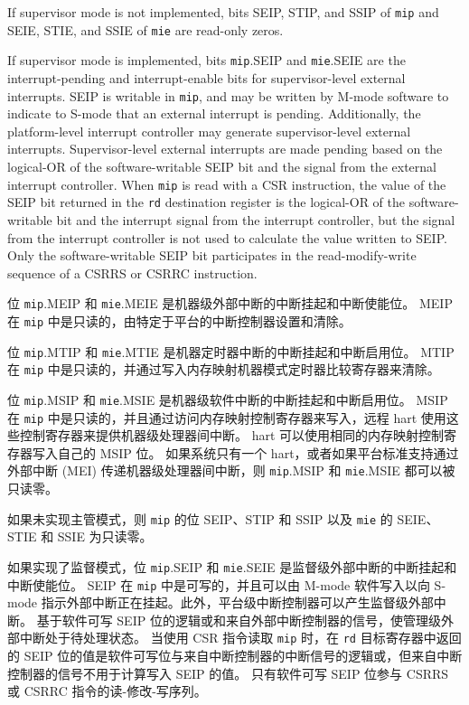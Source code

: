 If supervisor mode is not implemented, bits SEIP, STIP, and SSIP of
{\tt mip} and SEIE, STIE, and SSIE of {\tt mie} are read-only zeros.

If supervisor mode is implemented, bits {\tt mip}.SEIP and {\tt mie}.SEIE
are the interrupt-pending and interrupt-enable bits for supervisor-level
external interrupts.
SEIP is writable in {\tt mip}, and
may be written by M-mode software to indicate to S-mode that an
external interrupt is pending.  Additionally, the platform-level
interrupt controller may generate supervisor-level external interrupts.
Supervisor-level external interrupts are made pending based on the
logical-OR of the software-writable SEIP bit and the signal from the
external interrupt controller.
When {\tt mip} is read with a CSR instruction,
the value of the SEIP bit returned in the {\tt rd} destination
register is the logical-OR of the software-writable bit and the
interrupt signal from the interrupt controller, but the signal from the
interrupt controller is not used to calculate the value written to SEIP.
Only the software-writable SEIP bit participates in the
read-modify-write sequence of a CSRRS or CSRRC instruction.
\fi

位 {\tt mip}.MEIP 和 {\tt mie}.MEIE 是机器级外部中断的中断挂起和中断使能位。 MEIP 在 {\tt mip} 中是只读的，由特定于平台的中断控制器设置和清除。

位 {\tt mip}.MTIP 和 {\tt mie}.MTIE 是机器定时器中断的中断挂起和中断启用位。
MTIP 在 {\tt mip} 中是只读的，并通过写入内存映射机器模式定时器比较寄存器来清除。

位 {\tt mip}.MSIP 和 {\tt mie}.MSIE 是机器级软件中断的中断挂起和中断启用位。 MSIP 在 {\tt mip} 中是只读的，并且通过访问内存映射控制寄存器来写入，远程 hart 使用这些控制寄存器来提供机器级处理器间中断。
hart 可以使用相同的内存映射控制寄存器写入自己的 MSIP 位。 如果系统只有一个 hart，或者如果平台标准支持通过外部中断 (MEI) 传递机器级处理器间中断，则 {\tt mip}.MSIP 和 {\tt mie}.MSIE 都可以被只读零。

如果未实现主管模式，则 {\tt mip} 的位 SEIP、STIP 和 SSIP 以及 {\tt mie} 的 SEIE、STIE 和 SSIE 为只读零。

如果实现了监督模式，位 {\tt mip}.SEIP 和 {\tt mie}.SEIE 是监督级外部中断的中断挂起和中断使能位。
SEIP 在 {\tt mip} 中是可写的，并且可以由 M-mode 软件写入以向 S-mode 指示外部中断正在挂起。此外，平台级中断控制器可以产生监督级外部中断。
基于软件可写 SEIP 位的逻辑或和来自外部中断控制器的信号，使管理级外部中断处于待处理状态。
当使用 CSR 指令读取 {\tt mip} 时，在 {\tt rd} 目标寄存器中返回的 SEIP 位的值是软件可写位与来自中断控制器的中断信号的逻辑或，但来自中断控制器的信号不用于计算写入 SEIP 的值。
只有软件可写 SEIP 位参与 CSRRS 或 CSRRC 指令的读-修改-写序列。

